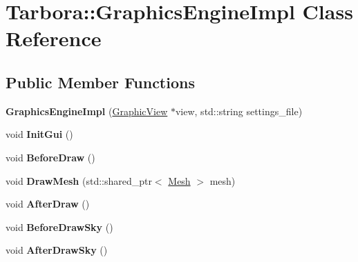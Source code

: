 \hypertarget{classTarbora_1_1GraphicsEngineImpl}{}\section{Tarbora\+:\+:Graphics\+Engine\+Impl Class Reference}
\label{classTarbora_1_1GraphicsEngineImpl}
\subsection*{Public Member Functions}
\begin{DoxyCompactItemize}
\item 
\mbox{\label{classTarbora_1_1GraphicsEngineImpl_a1290f63105d954932fad98302dd735a1}} 
{\bfseries Graphics\+Engine\+Impl} (\hyperlink{classTarbora_1_1GraphicView}{Graphic\+View} $\ast$view, std\+::string settings\+\_\+file)
\item 
\mbox{\label{classTarbora_1_1GraphicsEngineImpl_a271bcc842a745977dc5c107bdef17593}} 
void {\bfseries Init\+Gui} ()
\item 
\mbox{\label{classTarbora_1_1GraphicsEngineImpl_ae3baad87b312efa383edf23cbe5b0381}} 
void {\bfseries Before\+Draw} ()
\item 
\mbox{\label{classTarbora_1_1GraphicsEngineImpl_a2e4a1d8864d2a63dea5987d54b01ba83}} 
void {\bfseries Draw\+Mesh} (std\+::shared\+\_\+ptr$<$ \hyperlink{classTarbora_1_1Mesh}{Mesh} $>$ mesh)
\item 
\mbox{\label{classTarbora_1_1GraphicsEngineImpl_a5b3a5229c8614accf57072cb4f949006}} 
void {\bfseries After\+Draw} ()
\item 
\mbox{\label{classTarbora_1_1GraphicsEngineImpl_a8445c731da2c2ab7b0807be26d35d01b}} 
void {\bfseries Before\+Draw\+Sky} ()
\item 
\mbox{\label{classTarbora_1_1GraphicsEngineImpl_abd928d13f96ce114553411d55715d4d6}} 
void {\bfseries After\+Draw\+Sky} ()
\item 

\end{DoxyCompactItemize}
